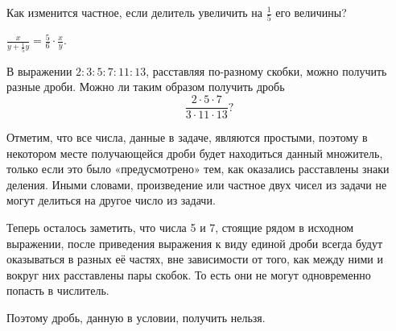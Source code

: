 
\begin{itemize}

	\itA Как изменится частное, если делитель увеличить на $\tfrac{1}{5}$ его величины?
	
	\itr $\frac{x}{y + \frac{1}{5}y} = \frac{5}{6} \cdot \frac{x}{y}$.
	
	\itB В выражении $2 : 3 : 5 : 7 : 11 : 13$, расставляя по-разному скобки, можно получить разные дроби. Можно ли таким образом получить дробь
	$$\frac{2 \cdot 5 \cdot 7}{3 \cdot 11 \cdot 13}?$$
	
	\itr Отметим, что все числа, данные в задаче, являются простыми, поэтому в некотором месте получающейся дроби будет находиться данный множитель, только если это было «предусмотрено» тем, как оказались расставлены знаки деления. Иными словами, произведение или частное двух чисел из задачи не могут делиться на другое число из задачи.
	
	Теперь осталось заметить, что числа 5 и 7, стоящие рядом в исходном выражении, после приведения выражения к виду единой дроби всегда будут оказываться в разных её частях, вне зависимости от того, как между ними и вокруг них расставлены пары скобок. То есть они не могут одновременно попасть в числитель.
	
	Поэтому дробь, данную в условии, получить нельзя.
	
\end{itemize}